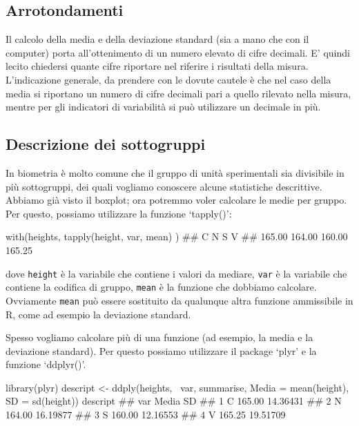 \documentclass[a4paper,12pt,oneside]{book}
\newenvironment{Shaded}{}{}
\newcommand{\KeywordTok}[1]{#1}
\newcommand{\DataTypeTok}[1]{#1}
\newcommand{\StringTok}[1]{#1}
\newcommand{\CommentTok}[1]{#1}
\newcommand{\OperatorTok}[1]{#1}
\newcommand{\NormalTok}[1]{#1}
\begin{document}
\hypertarget{arrotondamenti}{%
\subsection*{Arrotondamenti}\label{arrotondamenti}}

Il calcolo della media e della deviazione standard (sia a mano che con il computer) porta all'ottenimento di un numero elevato di cifre decimali. E' quindi lecito chiedersi quante cifre riportare nel riferire i risultati della misura. L'indicazione generale, da prendere con le dovute cautele è che nel caso della media si riportano un numero di cifre decimali pari a quello rilevato nella misura, mentre per gli indicatori di variabilità si può utilizzare un decimale in più.

\hypertarget{descrizione-dei-sottogruppi}{%
\subsection*{Descrizione dei sottogruppi}\label{descrizione-dei-sottogruppi}}

In biometria è molto comune che il gruppo di unità sperimentali sia divisibile in più sottogruppi, dei quali vogliamo conoscere alcune statistiche descrittive. Abbiamo già visto il boxplot; ora potremmo voler calcolare le medie per gruppo. Per questo, possiamo utilizzare la funzione `tapply()':

\begin{Shaded}
\begin{Highlighting}[]
\KeywordTok{with}\NormalTok{(heights, }\KeywordTok{tapply}\NormalTok{(height, var, mean) )}
\CommentTok{##      C      N      S      V }
\CommentTok{## 165.00 164.00 160.00 165.25}
\end{Highlighting}
\end{Shaded}

dove \texttt{height} è la variabile che contiene i valori da mediare, \texttt{var} è la variabile che contiene la codifica di gruppo, \texttt{mean} è la funzione che dobbiamo calcolare. Ovviamente \texttt{mean} può essere sostituito da qualunque altra funzione ammissibile in R, come ad esempio la deviazione standard.

Spesso vogliamo calcolare più di una funzione (ad esempio, la media e la deviazione standard). Per questo possiamo utilizzare il package `plyr' e la funzione `ddplyr()'.

\begin{Shaded}
\begin{Highlighting}[]
\KeywordTok{library}\NormalTok{(plyr)}
\NormalTok{descript <-}\StringTok{ }\KeywordTok{ddply}\NormalTok{(heights, }\OperatorTok{~}\NormalTok{var, summarise, }
                  \DataTypeTok{Media =} \KeywordTok{mean}\NormalTok{(height), }
                  \DataTypeTok{SD =} \KeywordTok{sd}\NormalTok{(height))}
\NormalTok{descript}
\CommentTok{##   var  Media       SD}
\CommentTok{## 1   C 165.00 14.36431}
\CommentTok{## 2   N 164.00 16.19877}
\CommentTok{## 3   S 160.00 12.16553}
\CommentTok{## 4   V 165.25 19.51709}
\end{Highlighting}
\end{Shaded}
\end{document}
